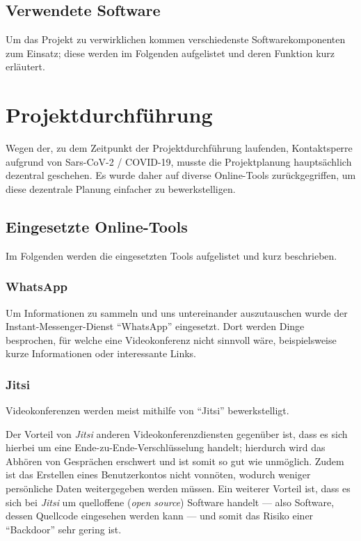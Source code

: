 \documentclass[a4paper,12pt]{article}
\begin{document}
\subsection{Verwendete Software}
Um das Projekt zu verwirklichen kommen verschiedenste Softwarekomponenten zum Einsatz; diese werden im Folgenden aufgelistet und deren Funktion kurz erläutert.

\pagebreak

\section{Projektdurchführung}
Wegen der, zu dem Zeitpunkt der Projektdurchführung laufenden, Kontaktsperre aufgrund von Sars-CoV-2 / COVID-19, musste die Projektplanung hauptsächlich dezentral geschehen.
Es wurde daher auf diverse Online-Tools zurückgegriffen, um diese dezentrale Planung einfacher zu bewerkstelligen.

\subsection{Eingesetzte Online-Tools}
Im Folgenden werden die eingesetzten Tools aufgelistet und kurz beschrieben.

\subsubsection{WhatsApp}
Um Informationen zu sammeln und uns untereinander auszutauschen wurde der Instant-Messenger-Dienst "`WhatsApp"' eingesetzt. Dort werden Dinge besprochen, für welche eine Videokonferenz nicht sinnvoll wäre, beispielsweise kurze Informationen oder interessante Links.

\subsubsection{Jitsi}
Videokonferenzen werden meist mithilfe von "`Jitsi"' bewerkstelligt.

Der Vorteil von \textit{Jitsi} anderen Videokonferenzdiensten gegenüber ist, dass es sich hierbei um eine Ende-zu-Ende-Verschlüsselung handelt; hierdurch wird das Abhören von Gesprächen erschwert und ist somit so gut wie unmöglich. Zudem ist das Erstellen eines Benutzerkontos nicht vonnöten, wodurch weniger persönliche Daten weitergegeben werden müssen. Ein weiterer Vorteil ist, dass es sich bei \textit{Jitsi} um quelloffene (\textit{open source}) Software handelt — also Software, dessen Quellcode eingesehen werden kann — und somit das Risiko einer "`Backdoor"' sehr gering ist.
\end{document}
